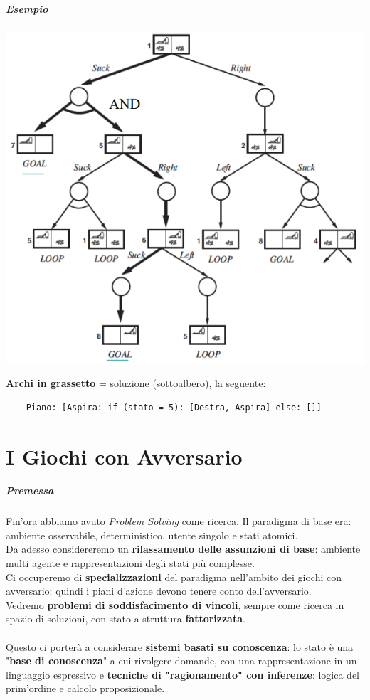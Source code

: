 \documentclass[10pt]{book}
\begin{document}
\paragraph{Esempio}
\begin{center}
	\includegraphics[scale=0.7]{andortree.png}
\end{center}
\textbf{Archi in grassetto} = soluzione (sottoalbero), la seguente:
\begin{lstlisting}
	Piano: [Aspira: if (stato = 5): [Destra, Aspira] else: []]
\end{lstlisting}
\chapter{I Giochi con Avversario}
\paragraph{Premessa}
Fin'ora abbiamo avuto \textit{Problem Solving} come ricerca. Il paradigma di base era: ambiente osservabile, deterministico, utente singolo e stati atomici.\\
Da adesso considereremo un \textbf{rilassamento delle assunzioni di base}: ambiente multi agente e rappresentazioni degli stati più complesse.\\
Ci occuperemo di \textbf{specializzazioni} del paradigma nell'ambito dei giochi con avversario: quindi i piani d'azione devono tenere conto dell'avversario.\\
Vedremo \textbf{problemi di soddisfacimento di vincoli}, sempre come ricerca in spazio di soluzioni, con stato a struttura \textbf{fattorizzata}.\\\\
Questo ci porterà a considerare \textbf{sistemi basati su conoscenza}: lo stato è una "\textbf{base di conoscenza}" a cui rivolgere domande, con una rappresentazione in un linguaggio espressivo e \textbf{tecniche di "ragionamento" con inferenze}: logica del prim'ordine e calcolo proposizionale.
\end{document}
